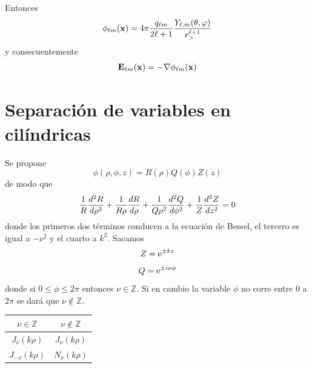 \documentclass[10pt,oneside]{CBFT_book}
\begin{document}
Entonces
\[
	\phi_{\ell m}(\vb{x})= 4\pi \frac{q_{\ell m}}{2\ell+1}\frac{Y_{\ell,m}(\theta,\varphi) }{r_>^{\ell+1}}
\]
y consecuentemente
\[
	\vb{E}_{\ell m}(\vb{x}) = - \Nabla \phi_{\ell m}(\vb{x})
\]

\section{Separación de variables en cilíndricas}

Se propone
\[
	\phi(\rho,\phi,z) = R(\rho) Q(\phi) Z(z)
\]
de modo que
\[
	\frac{1}{R} \dtot[2]{R}{\rho} + \frac{1}{R\rho} \dtot{R}{\rho} + \frac{1}{Q\rho^2} \dtot[2]{Q}{\phi} 
				+ \frac{1}{Z} \dtot[2]{Z}{z} = 0
\]
donde los primeros dos términos conducen a la ecuación de Bessel, el tercero es igual a $-\nu^2$ y el
cuarto a $k^2$. Sacamos
\[
	Z = \euler^{\pm kz}
\]
\[
	Q = \euler^{\pm i \nu \phi}
\]
donde si $0\leq \phi \leq 2\pi$ entonces $\nu \in \mathbb{Z}$. Si en cambio la variable $\phi$ no corre 
entre $0$ a $2\pi$ se dará que $\nu \notin \mathbb{Z}$.

\begin{center}
	\begin{tabular}{|c|c|}
	\hline
	$ \nu \in \mathbb{Z} $ & $ \nu \notin \mathbb{Z}  $ \\
	\hline
	$J_\nu(k\rho)$ & $J_\nu(k\rho)$ \\
	$J_{-\nu}(k\rho)$ & $N_\nu(k\rho)$ \\
	\hline
	\end{tabular} 
\end{center}




\end{document}
